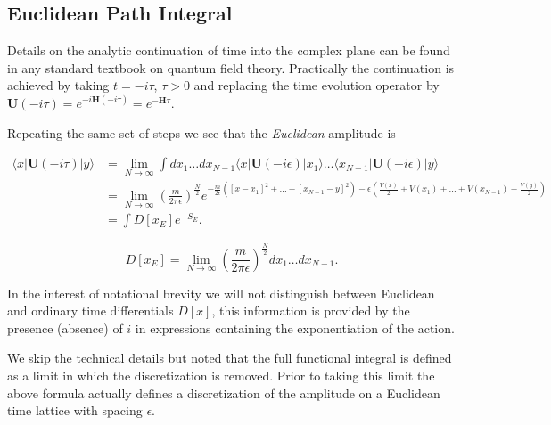 
\subsection{Euclidean Path Integral } \label{QCD::Euclidean_path_integral} 

Details on the analytic continuation of time into the complex plane can be found in any standard textbook on quantum field theory. Practically the continuation is achieved by taking $t = -i\tau$, $\tau > 0$ and replacing the time evolution operator by $\mathbf{U}(-i\tau) = e^{-i\mathbf{H}(-i\tau)} = e^{-\mathbf{H}\tau}$.

Repeating the same set of steps we see that the \emph{Euclidean} amplitude is 

 \begin{align*}
\langle x | \mathbf{U}(-i\tau) | y \rangle &= \lim_{N\to \infty} \int dx_1 \ldots dx_{N-1} \langle x | \mathbf{U}(-i\epsilon) | x_1 \rangle \ldots \langle x_{N-1} | \mathbf{U}(-i\epsilon) | y \rangle  \\
&= \lim_{N\to \infty}\left(\frac{m}{2\pi \epsilon}\right)^{\frac{N}{2}}e^{ - \frac{m}{2\epsilon} \left( [x-x_1]^2 + \ldots + [x_{N-1} -y]^2 \right) - \epsilon \left( \frac{V(x)}{2} + V(x_1) + \ldots + V(x_{N-1}) + \frac{V(y)}{2}\right)} \\
&= \int D[x_E] e^{-S_E}.
\end{align*}

\begin{equation*}
D[x_E] = \lim_{N\to \infty} \left(\frac{m}{2\pi \epsilon}\right)^{\frac{N}{2}} dx_1 \ldots dx_{N-1}. 
\end{equation*}

In the interest of notational brevity we will not distinguish between Euclidean and ordinary time differentials $D[x]$, this information is provided by the presence (absence) of $i$ in expressions containing the exponentiation of the action.

We skip the technical details but noted that the full functional integral is defined as a limit in which the discretization is removed. Prior to taking this limit the above formula actually defines a discretization of the amplitude on a Euclidean time lattice with spacing $\epsilon$. 

